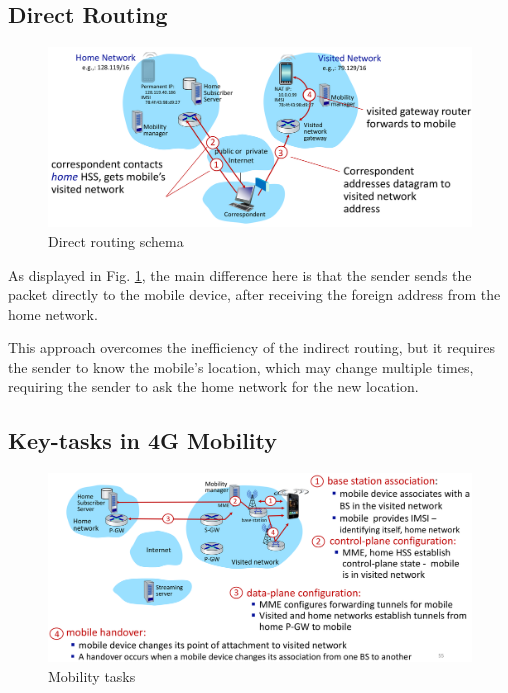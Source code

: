 \subsection{Direct Routing}
\begin{figure}[htbp]
   \centering
   \includegraphics{images/mn_direct.png}
   \caption{Direct routing schema}
   \label{fig:mn_direct}
\end{figure}
As displayed in Fig. \ref{fig:mn_direct}, the main difference here is that the sender sends the packet directly to the mobile device, after receiving the foreign address from the home network.

This approach overcomes the inefficiency of the indirect routing, but it requires the sender to know the mobile's location, which may change multiple times, requiring the sender to ask the home network for the new location.

\subsection{Key-tasks in 4G Mobility}
\begin{figure}[htbp]
   \centering
   \includegraphics{images/4g_mobilitytasks.png}
   \caption{Mobility tasks}
   \label{fig:4g_mobilitytasks}
\end{figure}

